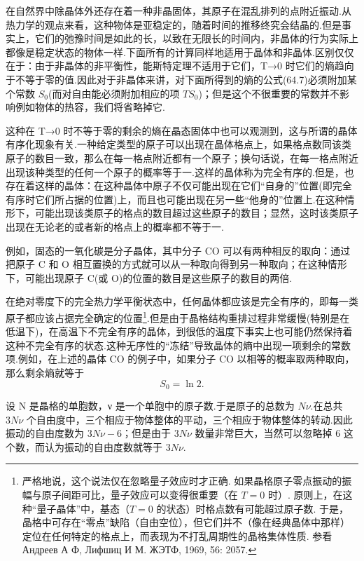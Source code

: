 在自然界中除晶体外还存在着一种非晶固体，其原子在混乱排列的点附近振动.从热力学的观点来看，这种物体是亚稳定的，随着时间的推移终究会结晶的.但是事实上，它们的弛豫时间是如此的长，以致在无限长的时间内，非晶体的行为实际上都像是稳定状态的物体一样.下面所有的计算同样地适用于晶体和非晶体.区别仅仅在于：由于非晶体的非平衡性，能斯特定理不适用于它们，T→0 时它们的熵趋向于不等于零的值.因此对于非晶体来讲，对下面所得到的熵的公式(64.7)必须附加某个常数 $S_0$(而对自由能必须附加相应的项 $TS_0$)；但是这个不很重要的常数并不影响例如物体的热容，我们将省略掉它.

这种在 T→0 时不等于零的剩余的熵在晶态固体中也可以观测到，这与所谓的晶体有序化现象有关.一种给定类型的原子可以出现在晶体格点上，如果格点数同该类原子的数目一致，那么在每一格点附近都有一个原子；换句话说，在每一格点附近出现该种类型的任何一个原子的概率等于一.这样的晶体称为完全有序的.但是，也存在着这样的晶体：在这种晶体中原子不仅可能出现在它们“自身的”位置(即完全有序时它们所占据的位置)上，而且也可能出现在另一些“他身的”位置上.在这种情形下，可能出现该类原子的格点的数目超过这些原子的数目；显然，这时该类原子出现在无论老的或者新的格点上的概率都不等于一.

例如，固态的一氧化碳是分子晶体，其中分子 CO 可以有两种相反的取向：通过把原子 C 和 O 相互置换的方式就可以从一种取向得到另一种取向；在这种情形下，可能出现原子 C(或 O)的位置的数目是这些原子的数目的两倍.

在绝对零度下的完全热力学平衡状态中，任何晶体都应该是完全有序的，即每一类原子都应该占据完全确定的位置\footnote{严格地说，这个说法仅在忽略量子效应时才正确. 如果晶格原子零点振动的振幅与原子间距可比，量子效应可以变得很重要（在 $T=0$ 时）. 原则上，在这种“量子晶体”中，基态（$T=0$ 的状态）时格点数有可能超过原子数. 于是，晶格中可存在“零点”缺陷（自由空位），但它们并不（像在经典晶体中那样）定位在任何特定的格点上，而表现为不打乱周期性的晶格集体性质. 参看 Андреев А Ф, Лифшиц И М. ЖЭТФ, 1969, 56: 2057.}.但是由于晶格结构重排过程非常缓慢(特别是在低温下)，在高温下不完全有序的晶体，到很低的温度下事实上也可能仍然保持着这种不完全有序的状态.这种无序性的“冻结”导致晶体的熵中出现一项剩余的常数项.例如，在上述的晶体 CO 的例子中，如果分子 CO 以相等的概率取两种取向，那么剩余熵就等于
\begin{equation*}
  S_0=\ln 2.
\end{equation*}

设 N 是晶格的单胞数，ν 是一个单胞中的原子数.于是原子的总数为 $N\nu$.在总共 $3N\nu$ 个自由度中，三个相应于物体整体的平动，三个相应于物体整体的转动.因此振动的自由度数为 $3N\nu-6$；但是由于 $3N\nu$ 数量非常巨大，当然可以忽略掉 6 这个数，而认为振动的自由度数就等于 $3N\nu$.

